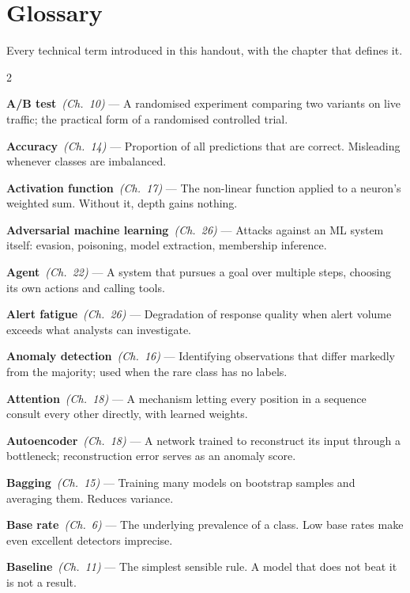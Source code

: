 \chapter{Glossary}\label{app:glossary}
\normalfigures

Every technical term introduced in this handout, with the chapter that defines it.

\newcommand{\gt}[3]{\textbf{#1}~{\small\textit{(Ch.~#2)}} --- #3\par\smallskip}

\begin{multicols}{2}
\small
\raggedright

\gt{A/B test}{10}{A randomised experiment comparing two variants on live traffic;
the practical form of a randomised controlled trial.}

\gt{Accuracy}{14}{Proportion of all predictions that are correct. Misleading
whenever classes are imbalanced.}

\gt{Activation function}{17}{The non-linear function applied to a neuron's weighted
sum. Without it, depth gains nothing.}

\gt{Adversarial machine learning}{26}{Attacks against an ML system itself: evasion,
poisoning, model extraction, membership inference.}

\gt{Agent}{22}{A system that pursues a goal over multiple steps, choosing its own
actions and calling tools.}

\gt{Alert fatigue}{26}{Degradation of response quality when alert volume exceeds
what analysts can investigate.}

\gt{Anomaly detection}{16}{Identifying observations that differ markedly from the
majority; used when the rare class has no labels.}

\gt{Attention}{18}{A mechanism letting every position in a sequence consult every
other directly, with learned weights.}

\gt{Autoencoder}{18}{A network trained to reconstruct its input through a
bottleneck; reconstruction error serves as an anomaly score.}

\gt{Bagging}{15}{Training many models on bootstrap samples and averaging them.
Reduces variance.}

\gt{Base rate}{6}{The underlying prevalence of a class. Low base rates make even
excellent detectors imprecise.}

\gt{Baseline}{11}{The simplest sensible rule. A model that does not beat it is not
a result.}


\end{multicols}
